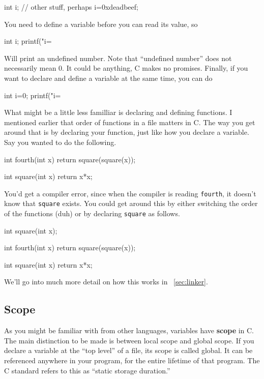 \documentclass[ebook,11pt,oneside,openany]{memoir}
\newcommand{\cf}[1]{\texttt{#1}}
\begin{document}
\begin{code}[language=C]
int i;
// other stuff, perhaps
i=0xdeadbeef;
\end{code}

\noindent
You need to define a variable before you can read its value, so

\begin{code}[language=C]
int i;
printf("i=%
\end{code}

\noindent
Will print an undefined number. Note that ``undefined number'' does not necessarily mean 0. It could be anything, C makes no promises. Finally, if you want to declare and define a variable at the same time, you can do

\begin{code}[language=C]
int i=0;
printf("i=%
\end{code}

What might be a little less familliar is declaring and defining functions. I mentioned earlier that order of functions in a file matters in C. The way you get around that is by declaring your function, just like how you declare a variable. Say you wanted to do the following.

\begin{code}[language=C]
int fourth(int x)
{
  return square(square(x));
}

int square(int x)
{
  return x*x;
}
\end{code}

You'd get a compiler error, since when the compiler is reading \cf{fourth}, it doesn't know that \cf{square} exists. You could get around this by either switching the order of the functions (duh) or by declaring \cf{square} as follows.

\begin{code}[language=C]

int square(int x);

int fourth(int x)
{
  return square(square(x));
}

int square(int x)
{
  return x*x;
}
\end{code}

We'll go into much more detail on how this works in ~\ref{sec:linker}.

\subsection{Scope}

As you might be familiar with from other languages, variables have \textbf{scope} in C. The main distinction to be made is between local scope and global scope. If you declare a variable at the ``top level'' of a file, its scope is called global. It can be referenced anywhere in your program, for the entire lifetime of that program. The C standard refers to this as ``static storage duration.''
\end{document}
